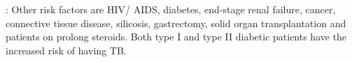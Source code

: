\documentclass[11pt,a4paper]{report}
\begin{document}
: Other risk factors are HIV/ AIDS, diabetes, end-stage renal failure, cancer, connective tissue disease, silicosis, gastrectomy, solid organ transplantation and patients on prolong steroids. Both type I and type II diabetic patients have the increased risk of having TB. 

%
%
\end{document}
